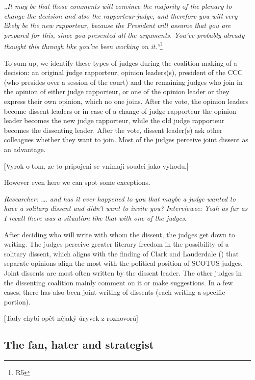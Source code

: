 \documentclass[
  11pt,
]{article}
\begin{document}
\emph{„It may be that those comments will convince the majority of the plenary to change the decision and also the rapporteur-judge, and therefore you will very likely be the new rapporteur, because the President will assume that you are prepared for this, since you presented all the arguments. You've probably already thought this through like you've been working on it.``}\footnote{R5}

To sum up, we identify these types of judges during the coalition making of a decision: an original judge rapporteur, opinion leaders(s), president of the CCC (who presides over a session of the court) and the remaining judges who join in the opinion of either judge rapporteur, or one of the opinion leader or they express their own opinion, which no one joins. After the vote, the opinion leaders become dissent leaders or in case of a change of judge rapporteur the opinion leader becomes the new judge rapporteur, while the old judge rapporteur becomes the dissenting leader. After the vote, dissent leader(s) ask other colleagues whether they want to join. Most of the judges perceive joint dissent as an advantage.

{[}Vyrok o tom, ze to pripojeni se vnimaji soudci jako vyhodu.{]}

However even here we can spot some exceptions.

\emph{Researcher: \ldots. and has it ever happened to you that maybe a judge wanted to have a solitary dissent and didn't want to invite you?}
\emph{Interviewee: Yeah as far as I recall there was a situation like that with one of the judges.}

After deciding who will write with whom the dissent, the judges get down to writing. The judges perceive greater literary freedom in the possibility of a solitary dissent, which aligns with the finding of Clark and Lauderdale () that separate opinions align the most with the political position of SCOTUS judges. Joint dissents are most often written by the dissent leader. The other judges in the dissenting coalition mainly comment on it or make suggestions. In a few cases, there has also been joint writing of dissents (each writing a specific portion).

{[}Tady chybí opět nějaký úryvek z rozhovorů{]}

\subsection{The fan, hater and strategist}\label{stances}
\end{document}
